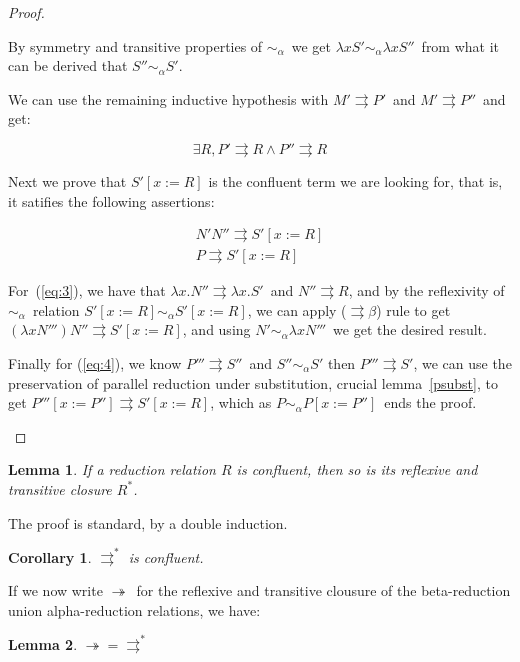 \documentclass[preprint,10pt]{sigplanconf}
\newcommand{\breds}{\ensuremath{\twoheadrightarrow}}
\newcommand{\lam}{\ensuremath{\lambda}}
\newcommand{\alpsym}{\ensuremath{\sim_\alpha}}
\newcommand{\p}{\ensuremath{\rightrightarrows}}
\newtheorem{lemma}{Lemma}
\newtheorem{coro}{Corollary}
\begin{document}
\begin{proof}
\begin{itemize}
          By symmetry and transitive properties of \alpsym\ we get $\lam x S' \alpsym \lam x S''$\ from what it can be derived that $S'' \alpsym S'$.
          
          We can use the remaining inductive hypothesis with $M' \p P'$\ and $M' \p P''$\ and get:

          \begin{equation*}
            \exists R, P' \p R \wedge P'' \p R
          \end{equation*}

          Next we prove that $S' [x{:=}R]$ is the confluent term we are looking for, that is, it satifies the following assertions:

          \begin{align}
            \label{eq:3}
            N' N'' \p S' [x{:=}R] \\
            \label{eq:4}
             P \p S' [x{:=}R]
          \end{align}

          For~(\ref{eq:3}),  we have that $\lam x . N'' \p \lam x . S' $\ and $N'' \p R$, and by the reflexivity of \alpsym\ relation $S'[x{:=}R] \alpsym S'[x{:=}R]$, we can apply ($\p\beta$) rule to get $(\lam x N''') N'' \p S' [x{:=}R]$, and using $N' \alpsym \lam x N'''$\ we get the desired result.

          Finally for (\ref{eq:4}), we know $P''' \p S''$\ and $S'' \alpsym S'$ then $P''' \p S'$, we can use the preservation of parallel reduction under substitution, crucial lemma~\ref{psubst}, to get $P'''[x{:=}P''] \p S'[x{:=}R]$, which as $P \alpsym P[x{:=}P'']$\ ends the proof.
    \end{itemize}
  \end{proof}


\begin{lemma}
If a reduction relation $R$ is confluent, then so is its reflexive and transitive closure $R^*$.
\end{lemma}

The proof is standard, by a double induction.

\begin{coro}
$\p^*$ is confluent.
\end{coro}

If we now write \breds\ for the reflexive and transitive clousure of the beta-reduction union alpha-reduction relations, we have:

\begin{lemma} $ \breds = \p^* $
\end{lemma}
\end{document}
